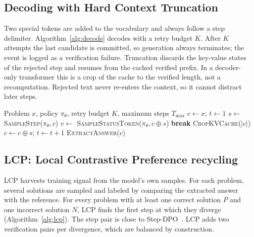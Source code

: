 \documentclass[11pt, a4paper]{article}
\newcommand{\valid}{\texttt{<|step\_\allowbreak valid|>}}
\begin{document}
\subsection{Decoding with Hard Context Truncation}
Two special tokens are added to the vocabulary and always follow a step delimiter. Algorithm~\ref{alg:decode} decodes with a retry budget $K$. After $K$ attempts the last candidate is committed, so generation always terminates; the event is logged as a verification failure. Truncation discards the key-value states of the rejected step and resumes from the cached verified prefix. In a decoder-only transformer this is a crop of the cache to the verified length, not a recomputation. Rejected text never re-enters the context, so it cannot distract later steps.

\begin{algorithm}[t]
\caption{Step-level decoding with Hard Context Truncation}
\label{alg:decode}
\begin{algorithmic}[1]
\Require Problem $x$, policy $\pi_\theta$, retry budget $K$, maximum steps $T_{\max}$
\State $c \gets x$; \quad $t \gets 1$
        \State $s \gets$ \textsc{SampleStep}($\pi_\theta, c$) 
        \State $v \gets$ \textsc{SampleStatusToken}($\pi_\theta, c \oplus s$) 
        \If{$v=$ \valid{} \textbf{or} $k=K$}
            \State \textbf{break} 
        \EndIf
        \State \textsc{CropKVCache}($|c|$) 
    \EndFor
    \State $c \gets c \oplus s$; \quad $t \gets t+1$
\EndWhile
\State \Return \textsc{ExtractAnswer}($c$)
\end{algorithmic}
\end{algorithm}

\subsection{LCP: Local Contrastive Preference recycling}
\label{sec:lcp}
LCP harvests training signal from the model's own samples. For each problem, several solutions are sampled and labeled by comparing the extracted answer with the reference. For every problem with at least one correct solution $P$ and one incorrect solution $N$, LCP finds the first step at which they diverge (Algorithm~\ref{alg:lcp}). The step pair is close to Step-DPO~\cite{lai2024stepdpo}. LCP adds two verification pairs per divergence, which are balanced by construction.
\end{document}
